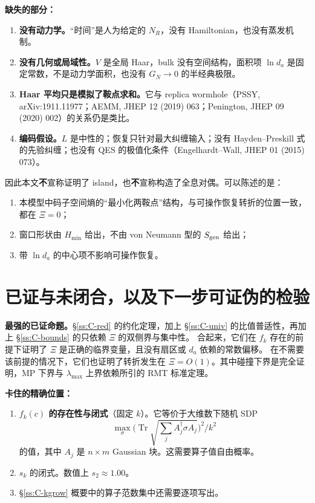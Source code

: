 \documentclass[11pt,a4paper,UTF8]{ctexart}
\newcommand{\Tr}{\operatorname{Tr}}
\begin{document}
\noindent\textbf{缺失的部分：}
\begin{enumerate}
  \item \textbf{没有动力学。}“时间”是人为给定的 $N_R$，没有 Hamiltonian，也没有蒸发机制。
  \item \textbf{没有几何或局域性。}$V$ 是全局 Haar，bulk 没有空间结构，面积项 $\ln d_a$ 是固定常数，不是动力学面积，也没有 $G_N\to0$ 的半经典极限。
  \item \textbf{Haar 平均只是模拟了鞍点求和。}它与 replica wormhole（PSSY, arXiv:1911.11977；AEMM, JHEP 12 (2019) 063；Penington, JHEP 09 (2020) 002）的关系仍是类比。
  \item \textbf{编码假设。}$L$ 是中性的；恢复只针对最大纠缠输入；没有 Hayden--Preskill 式的先验纠缠；也没有 QES 的极值化条件（Engelhardt--Wall, JHEP 01 (2015) 073）。
\end{enumerate}
因此本文\textbf{不}宣称证明了 island，也\textbf{不}宣称构造了全息对偶。可以陈述的是：
\begin{enumerate}
  \item 本模型中码子空间熵的“最小化两鞍点”结构，与可操作恢复转折的位置一致，都在 $\Xi=0$；
  \item 窗口形状由 $H_{\min}$ 给出，不由 von Neumann 型的 $S_{\rm gen}$ 给出；
  \item 带 $\ln d_a$ 的中心项不影响可操作恢复。
\end{enumerate}

\section{已证与未闭合，以及下一步可证伪的检验}\label{sec:open}

\textbf{最强的已证命题。}\S\ref{ss:C-red} 的约化定理，加上 \S\ref{ss:C-univ} 的比值普适性，再加上 \S\ref{ss:C-bounds} 的只依赖 $\Xi$ 的双侧界与集中性。
合起来，它们在 $f_k$ 存在的前提下证明了 $\Xi$ 是正确的临界变量，且没有扇区或 $d_a$ 依赖的常数偏移。
在不需要该前提的情况下，它们也证明了转折发生在 $\Xi=O(1)$。其中碰撞下界是完全证明，MP 下界与 $\lambda_{\max}$ 上界依赖所引的 RMT 标准定理。

\medskip\noindent\textbf{卡住的精确位置：}
\begin{enumerate}
  \item \textbf{$f_k(c)$ 的存在性与闭式}（固定 $k$）。它等价于大维数下随机 SDP
  \[
  \max_{\sigma}\Big(\Tr\sqrt{\textstyle\sum_jA_j^\dagger\sigma A_j}\Big)^2\Big/k^2
  \]
  的值，其中 $A_j$ 是 $n\times m$ Gaussian 块。这需要算子值自由概率。
  \item $s_k$ 的闭式。数值上 $s_2\approx1.00$。
  \item \S\ref{ss:C-kgrow} 概要中的算子范数集中还需要逐项写出。
\end{enumerate}
\end{document}
